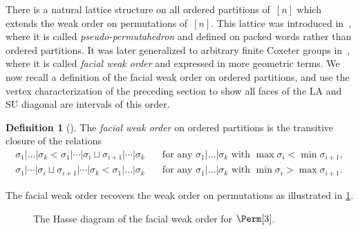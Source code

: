 \documentclass{amsart}
\newcommand{\darkblue}{\color{darkblue}} %
\theoremstyle{definition}
\newtheorem{definition}[theorem]{Definition}
\newcommand{\defn}[1]{\textsl{\darkblue #1}} %
\newcommand{\SU}{\mathrm{SU}}
\newcommand{\LA}{\mathrm{LA}}
\begin{document}
There is a natural lattice structure on all ordered partitions of~$[n]$ which extends the weak order on permutations of~$[n]$.
This lattice was introduced in~\cite{KrobLatapyNovelliPhanSchwer}, where it is called \emph{pseudo-permutahedron} and defined on packed words rather than ordered partitions.
It was later generalized to arbitrary finite Coxeter groups in~\cite{PalaciosRonco, DermenjianHohlwegPilaud}, where it is called \emph{facial weak order} and expressed in more geometric terms.
We now recall a definition of the facial weak order on ordered partitions, and use the vertex characterization of the preceding section to show all faces of the  $\LA$ and $\SU$ diagonal are intervals of this order.

\begin{definition}[\cite{KrobLatapyNovelliPhanSchwer,PalaciosRonco,DermenjianHohlwegPilaud}]
The \defn{facial weak order} on ordered partitions is the transitive closure of the relations
\begin{align}
    \sigma_1|\dots|\sigma_k < \sigma_1|\cdots|\sigma_i \sqcup \sigma_{i+1}|\cdots|\sigma_k \quad & \text{for any } \sigma_1|\dots|\sigma_k \text{ with } \max \sigma_i < \min \sigma_{i+1},  \label{eq:facial weak 1}\\
    \sigma_1|\cdots|\sigma_i \sqcup \sigma_{i+1}|\cdots|\sigma_k < \sigma_1|\dots|\sigma_k \quad & \text{for any } \sigma_1|\dots|\sigma_k \text{ with } \min \sigma_i > \max \sigma_{i+1}. \label{eq:facial weak 2}
\end{align}
\end{definition}

The facial weak order recovers the weak order on permutations as illustrated in \cref{fig:Hasse diagram Perm3}.
\begin{figure}
\caption{The Hasse diagram of the facial weak order for $\Perm[3]$.}
\label{fig:Hasse diagram Perm3}
\end{figure}
\end{document}
